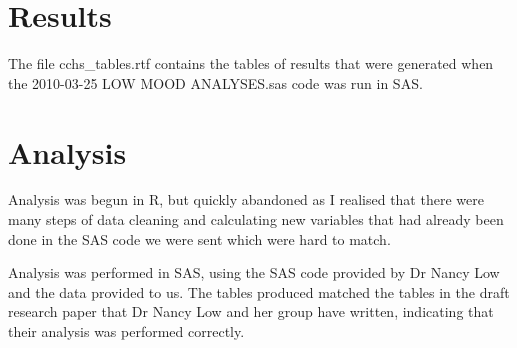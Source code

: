 \documentclass{article}
\begin{document}
\section{Results}
The file cchs\_tables.rtf contains the tables of results that were 
generated when the 2010-03-25 LOW MOOD ANALYSES.sas code was run in SAS.

\section{Analysis}
Analysis was begun in R, but quickly abandoned as I realised that there
were many steps of data cleaning and calculating new variables that had
already been done in the SAS code we were sent which were hard to match.

Analysis was performed in SAS, using the SAS code provided by Dr Nancy 
Low and the data provided to us. The tables produced matched the tables 
in the draft research paper that Dr Nancy Low and her group have written,
indicating that their analysis was performed correctly.
\end{document}
